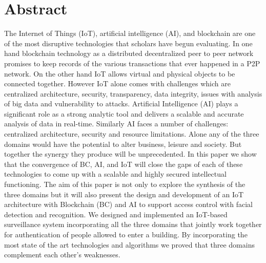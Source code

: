 \chapter*{Abstract}



The Internet of Things (IoT), artificial
intelligence (AI), and blockchain are one of the most disruptive technologies that scholars have begun evaluating. In one hand blockchain technology as a distributed  decentralized peer to peer network promises to keep  records of the various transactions that ever happened in a P2P network. On the other hand IoT allows virtual and physical objects to be connected together. However IoT alone comes with challenges which are centralized architecture, security, transparency, data integrity, issues with analysis of big data and vulnerability to attacks. Artificial Intelligence (AI) plays a significant role as a strong analytic tool and delivers a scalable and accurate analysis of data in real-time. Similarly AI faces a number of challenges: centralized architecture, security and resource limitations. Alone any of the three domains would have the potential to alter business, leisure and society. But together the synergy they produce will be unprecedented. 
In this paper we show that the convergence of BC, AI, and IoT will close the gaps of each of these technologies to come up with a scalable and highly secured intellectual functioning. The aim of this paper is not only to  explore the synthesis of the three domains but it will also present the design and development of an IoT architecture with Blockchain (BC) and AI to support access control with facial detection and recognition. We designed and implemented an IoT-based surveillance system incorporating all the three domains that jointly work together for authentication of people allowed to enter a building.  By incorporating the most state of the art technologies and algorithms we proved that three domains complement each other's weaknesses. 


\newpage






